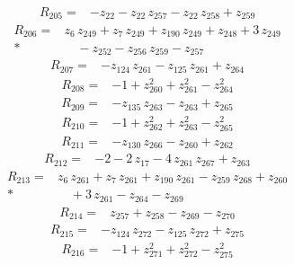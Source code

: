\documentclass[10pt]{article}
\begin{document}
\begin{align*}
R_{205}={}& - z_{22} - z_{22}\,z_{257} - z_{22}\,z_{258} + z_{259}
\end{align*}
\begin{align*}
R_{206}={}& z_{6}\,z_{249} + z_{7}\,z_{249} + z_{190}\,z_{249} + z_{248} + 3\,z_{249} \\*
&\quad - z_{252} - z_{256}\,z_{259} - z_{257}
\end{align*}
\begin{align*}
R_{207}={}& - z_{124}\,z_{261} - z_{125}\,z_{261} + z_{264}
\end{align*}
\begin{align*}
R_{208}={}& - 1 + z_{260}^{2} + z_{261}^{2} - z_{264}^{2}
\end{align*}
\begin{align*}
R_{209}={}& - z_{135}\,z_{263} - z_{263} + z_{265}
\end{align*}
\begin{align*}
R_{210}={}& - 1 + z_{262}^{2} + z_{263}^{2} - z_{265}^{2}
\end{align*}
\begin{align*}
R_{211}={}& - z_{130}\,z_{266} - z_{260} + z_{262}
\end{align*}
\begin{align*}
R_{212}={}& - 2 - 2\,z_{17} - 4\,z_{261}\,z_{267} + z_{263}
\end{align*}
\begin{align*}
R_{213}={}& z_{6}\,z_{261} + z_{7}\,z_{261} + z_{190}\,z_{261} - z_{259}\,z_{268} + z_{260} \\*
&\quad + 3\,z_{261} - z_{264} - z_{269}
\end{align*}
\begin{align*}
R_{214}={}& z_{257} + z_{258} - z_{269} - z_{270}
\end{align*}
\begin{align*}
R_{215}={}& - z_{124}\,z_{272} - z_{125}\,z_{272} + z_{275}
\end{align*}
\begin{align*}
R_{216}={}& - 1 + z_{271}^{2} + z_{272}^{2} - z_{275}^{2}
\end{align*}
\end{document}
